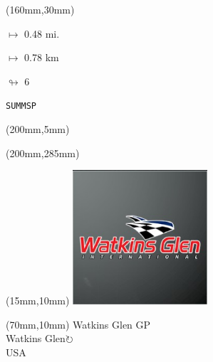 \begin{textblock*}{40mm}(160mm,30mm)%
\Large
\par$\mapsto$ 0.48 mi.
\par$\mapsto$ 0.78 km
\par$\looparrowright$ 6
\par\hfill\tiny\tt SUMMSP\\
\end{textblock*}
\begin{textblock*}{20mm}(200mm,5mm)%
\fbox{\thepage}
\label{SUMMSP}
\end{textblock*}
\begin{textblock*}{20mm}(200mm,285mm)%
\fbox{\thepage}
\end{textblock*}

\null\newpage
\begin{textblock*}{50mm}(15mm,10mm)%
\includegraphics[width=50mm]{LG/2015-05-20_00097.png}
\end{textblock*}
\begin{textblock*}{130mm}(70mm,10mm)%
{\fontsize{20}{20}\selectfont Watkins Glen GP\\}
{\fontsize{16}{16}\selectfont Watkins Glen\hfill \Large$\circlearrowright$\\}
{\fontsize{12}{12}\selectfont USA\\}
\end{textblock*}
